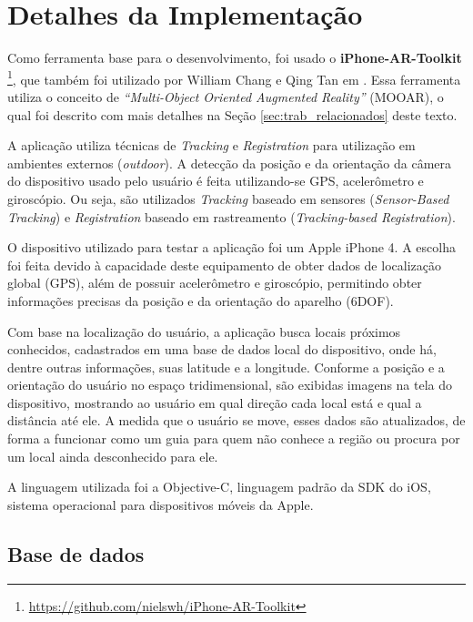\section{Detalhes da Implementação}


Como ferramenta base para o desenvolvimento, foi usado o \textbf{iPhone-AR-Toolkit}
\footnote{\href{https://github.com/nielswh/iPhone-AR-Toolkit}{https://github.com/nielswh/iPhone-AR-Toolkit}},
que também foi utilizado por William Chang e Qing Tan em \cite{MOOAR_Study}.
Essa ferramenta utiliza o conceito de \textit{``Multi-Object Oriented Augmented Reality''} (MOOAR), o qual 
foi descrito com mais detalhes na Seção \ref{sec:trab_relacionados} deste texto.

A aplicação utiliza técnicas de \textit{Tracking} e \textit{Registration} para utilização em ambientes 
externos (\textit{outdoor}). A detecção da posição e da orientação da câmera do dispositivo usado pelo 
usuário é feita utilizando-se
\gls{GPS}, acelerômetro e giroscópio. Ou seja, são utilizados \textit{Tracking} baseado em sensores 
(\textit{Sensor-Based Tracking}) e \textit{Registration} baseado em rastreamento 
(\textit{Tracking-based Registration}).


O dispositivo utilizado para testar a aplicação foi um Apple iPhone 4. A escolha foi feita devido à capacidade deste 
equipamento de obter dados de localização global (\gls{GPS}), além de possuir acelerômetro e giroscópio, permitindo
obter informações precisas da posição e da orientação do aparelho (\gls{6DOF}).


Com base na localização do usuário, a aplicação busca locais próximos conhecidos, cadastrados em uma base de dados
local do dispositivo, onde há, dentre outras informações, suas latitude e a longitude. Conforme a posição e a
orientação do usuário no espaço tridimensional, são exibidas imagens na tela do dispositivo, mostrando ao usuário
em qual direção cada local está e qual a distância até ele. A medida que o usuário se move, esses dados são atualizados,
de forma a funcionar como um guia para quem não conhece a região ou procura por um local ainda desconhecido para ele.

A linguagem utilizada foi a Objective-C, linguagem padrão da \gls{SDK} do iOS, sistema operacional para dispositivos 
móveis da Apple.


\subsection{Base de dados}

